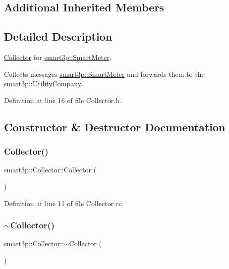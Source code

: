 \subsection*{Additional Inherited Members}


\subsection{Detailed Description}
\hyperlink{classsmart3p_1_1Collector}{Collector} for \hyperlink{classsmart3p_1_1SmartMeter}{smart3p\+::\+Smart\+Meter}. 

Collects messages \hyperlink{classsmart3p_1_1SmartMeter}{smart3p\+::\+Smart\+Meter} and forwards them to the \hyperlink{classsmart3p_1_1UtilityCompany}{smart3p\+::\+Utility\+Company}. 

Definition at line 16 of file Collector.\+h.



\subsection{Constructor \& Destructor Documentation}
\mbox{\label{classsmart3p_1_1Collector_afb4275cafc381a2650b7a6dd9465662e}} 
\subsubsection{\texorpdfstring{Collector()}{Collector()}}
{\footnotesize\ttfamily smart3p\+::\+Collector\+::\+Collector (\begin{DoxyParamCaption}{ }\end{DoxyParamCaption})}



Definition at line 11 of file Collector.\+cc.

\mbox{\label{classsmart3p_1_1Collector_a650466fb964d056afb0f35b1d6966e7c}} 
\subsubsection{\texorpdfstring{$\sim$\+Collector()}{~Collector()}}
{\footnotesize\ttfamily smart3p\+::\+Collector\+::$\sim$\+Collector (\begin{DoxyParamCaption}{ }\end{DoxyParamCaption})\hspace{0.3cm}{\ttfamily [virtual]}}



